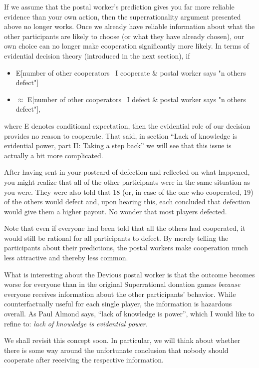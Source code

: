 \documentclass{book}
\begin{document}
If we assume that the postal worker’s prediction gives you far more reliable evidence than your own action, then the superrationality argument presented above no longer works. Once we already have reliable information about what the other participants are likely to choose (or what they have already chosen), our own choice can no longer make cooperation significantly more likely. In terms of evidential decision theory (introduced in the next section), if
\begin{itemize}
\item[\textperiodcentered] E[number of other cooperators \textbar\ I cooperate \& postal worker says "n others defect"]
\item[\textperiodcentered] $\approx$ E[number of other cooperators \textbar\ I defect \& postal worker says "n others defect"],
\end{itemize}
where E denotes conditional expectation, then the evidential role of our decision provides no reason to cooperate. That said, in section “Lack of knowledge is evidential power, part II: Taking a step back” we will see that this issue is actually a bit more complicated.

After having sent in your postcard of defection and reflected on what happened, you might realize that all of the other participants were in the same situation as you were. They were also told that 18 (or, in case of the one who cooperated, 19) of the others would defect and, upon hearing this, each concluded that defection would give them a higher payout. No wonder that most players defected. 

Note that even if everyone had been told that all the others had cooperated, it would still be rational for all participants to defect. By merely telling the participants about their predictions, the postal workers make cooperation much less attractive and thereby less common.

What is interesting about the Devious postal worker is that the outcome becomes worse for everyone than in the original Superrational donation games \textit{because} everyone receives information about the other participants’ behavior. While counterfactually useful for each single player, the information is hazardous \parencite{Bostrom2011-zr} overall. As Paul Almond \parencite*[][ch. 4.5]{Almond2010-xn} says, “lack of knowledge is power”, which I would like to refine to: \textit{lack of knowledge is evidential power.}

We shall revisit this concept soon. In particular, we will think about whether there is some way around the unfortunate conclusion that nobody should cooperate after receiving the respective information.
\end{document}
